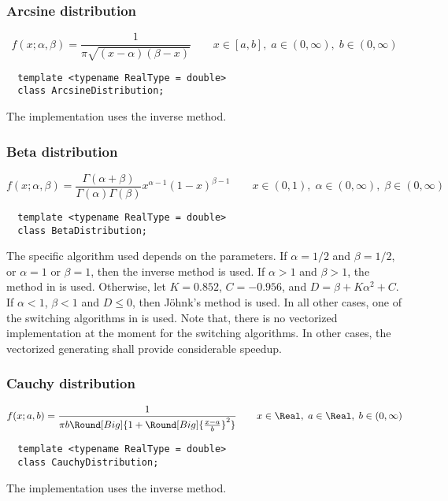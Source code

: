 \subsubsection{Arcsine distribution}

\begin{equation*}
  f(x;\alpha,\beta) = \frac{1}{\pi\sqrt{(x - \alpha)(\beta - x)}} \qquad
  x \in [a, b],\; a \in (0,\infty),\; b \in (0,\infty)
\end{equation*}
\begin{Verbatim}
  template <typename RealType = double>
  class ArcsineDistribution;
\end{Verbatim}
The implementation uses the inverse method.

\subsubsection{Beta distribution}

\begin{equation*}
  f(x;\alpha,\beta) =
  \frac{\Gamma(\alpha + \beta)}{\Gamma(\alpha)\Gamma(\beta)}
  x^{\alpha - 1}(1 - x)^{\beta - 1} \qquad
  x \in (0, 1),\; \alpha \in (0,\infty),\; \beta \in (0,\infty)
\end{equation*}
\begin{Verbatim}
  template <typename RealType = double>
  class BetaDistribution;
\end{Verbatim}
The specific algorithm used depends on the parameters. If $\alpha = 1/2$ and
$\beta = 1/2$, or $\alpha = 1$ or $\beta = 1$, then the inverse method is used.
If $\alpha > 1$ and $\beta > 1$, the method in \cite{Cheng:1978jl} is used.
Otherwise, let $K = 0.852$, $C = -0.956$, and $D = \beta + K\alpha^2 + C$. If
$\alpha < 1$, $\beta < 1$ and $D \le 0$, then Jöhnk's method
\parencite[sec.~3.5]{Devroye:1986gi} is used. In all other cases, one of the
switching algorithms in \textcite{Atkinson:1979es} is used. Note that, there is
no vectorized implementation at the moment for the switching algorithms. In
other cases, the vectorized generating shall provide considerable speedup.

\subsubsection{Cauchy distribution}

\begin{equation*}
  f(x;a,b) =
  \frac{1}{\pi b\Round[Big]{1 + \Round[Big]{\frac{x - a}{b}}^2}} \qquad
  x \in \Real,\; a \in \Real,\; b \in (0,\infty)
\end{equation*}
\begin{Verbatim}
  template <typename RealType = double>
  class CauchyDistribution;
\end{Verbatim}
The implementation uses the inverse method.

